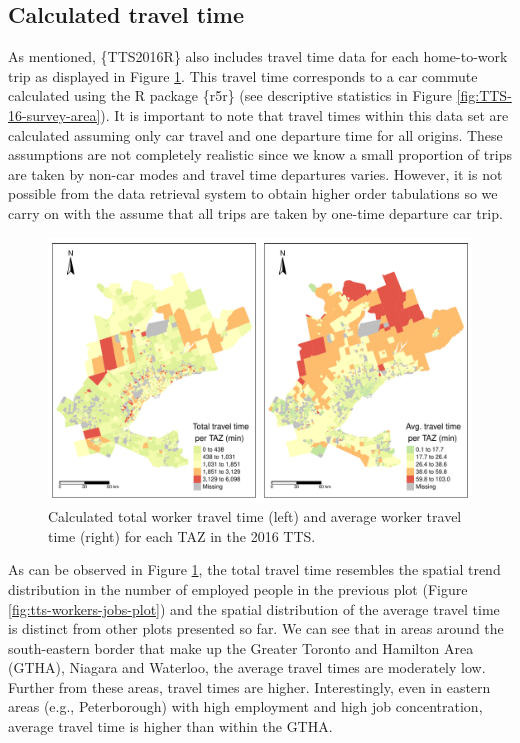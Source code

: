 \documentclass[Royal,times,sageh]{sagej}
\begin{document}
\hypertarget{calculated-travel-time}{%
\subsection{Calculated travel time}\label{calculated-travel-time}}

As mentioned, \{TTS2016R\} also includes travel time data for each
home-to-work trip as displayed in Figure \ref{fig:plot-tt-ttpertrip}.
This travel time corresponds to a car commute calculated using the R
package \{r5r\} (see descriptive statistics in Figure
\ref{fig:TTS-16-survey-area}). It is important to note that travel times
within this data set are calculated assuming only car travel and one
departure time for all origins. These assumptions are not completely
realistic since we know a small proportion of trips are taken by non-car
modes and travel time departures varies. However, it is not possible
from the data retrieval system to obtain higher order tabulations so we
carry on with the assume that all trips are taken by one-time departure
car trip.

\begin{figure}
\includegraphics[width=1\linewidth]{Manuscript-Data-Package_files/figure-latex/plot-tt-ttpertrip-1} \caption{\label{fig:plot-tt-ttpertrip}Calculated total worker travel time (left) and average worker travel time (right) for each TAZ in the 2016 TTS.}\label{fig:plot-tt-ttpertrip}
\end{figure}

\newpage

As can be observed in Figure \ref{fig:plot-tt-ttpertrip}, the total
travel time resembles the spatial trend distribution in the number of
employed people in the previous plot (Figure
\ref{fig:tts-workers-jobs-plot}) and the spatial distribution of the
average travel time is distinct from other plots presented so far. We
can see that in areas around the south-eastern border that make up the
Greater Toronto and Hamilton Area (GTHA), Niagara and Waterloo, the
average travel times are moderately low. Further from these areas,
travel times are higher. Interestingly, even in eastern areas (e.g.,
Peterborough) with high employment and high job concentration, average
travel time is higher than within the GTHA.
\end{document}
